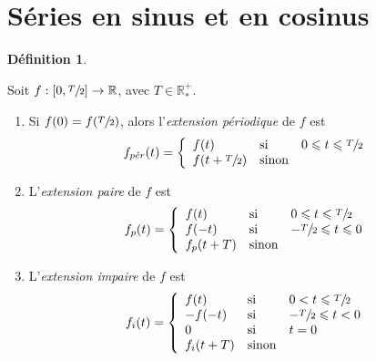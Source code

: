 \documentclass{report}
\newcommand*{\lte}{\leqslant}
\newcommand*{\reels}{\mathbb{R}}
\theoremstyle{definition}
\newtheorem*{defin}{D\'efinition}
\theoremstyle{remark}
\begin{document}
	\section{S\'eries en sinus et en cosinus}
	\begin{defin}~

		Soit $f:[0,\sfrac{T}{2}] \to \reels$, avec $T \in \reels_*^+$.
		\begin{enumerate}[label=\alph*)]
			\item Si $f(0) = f(\sfrac{T}{2})$, alors l'\emph{extension p\'eriodique} de $f$ est
			\begin{equation*}
				f_{p\acute er}(t) = \left\{ \begin{array}{lll}
					f(t)&\text{si}&0 \lte t \lte \sfrac{T}{2}\\
					f(t+\sfrac{T}{2})&\text{sinon}
				\end{array} \right.
			\end{equation*}
			\item L'\emph{extension paire} de $f$ est
			\begin{equation*}
				f_p(t) = \left\{\begin{array}{lll}
					f(t)&\text{si}&0 \lte t \lte \sfrac{T}{2}\\
					f(-t)&\text{si}&-\sfrac{T}{2} \lte t \lte 0\\
					f_p(t+T)&\text{sinon}
				\end{array}\right.
			\end{equation*}
			\item L'\emph{extension impaire} de $f$ est
			\begin{equation*}
				f_i(t)= \left\{\begin{array}{lll}
					f(t)&\text{si}&0 < t \lte \sfrac{T}{2}\\
					-f(-t)&\text{si}&-\sfrac{T}{2} \lte t < 0\\
					0&\text{si}&t=0\\
					f_i(t+T)&\text{sinon}
				\end{array}\right.
			\end{equation*}
		\end{enumerate}
	\end{defin}
\end{document}
